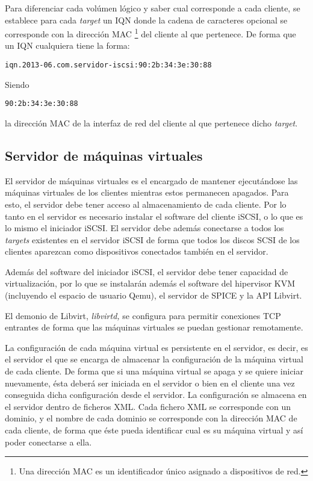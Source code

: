 \documentclass[spanisheDIVcalc,twoside,parskip-,pointlessnumbers,final]{scrbook}
\begin{document}
Para diferenciar cada volúmen lógico y saber cual corresponde a cada
cliente, se establece para cada \emph{target }un IQN donde la cadena
de caracteres opcional se corresponde con la dirección MAC%
\footnote{Una dirección MAC es un identificador único asignado a dispositivos
de red.%
} del cliente al que pertenece. De forma que un IQN cualquiera tiene
la forma:

\begin{lstlisting}
iqn.2013-06.com.servidor-iscsi:90:2b:34:3e:30:88
\end{lstlisting}


Siendo 
\begin{lstlisting}
90:2b:34:3e:30:88
\end{lstlisting}
\emph{ }la dirección MAC de la interfaz
de red del cliente al que pertenece dicho \emph{target}.


\subsection{Servidor de máquinas virtuales}

El servidor de máquinas virtuales es el encargado de mantener ejecutándose
las máquinas virtuales de los clientes mientras estos permanecen apagados.
Para esto, el servidor debe tener acceso al almacenamiento de cada
cliente. Por lo tanto en el servidor es necesario instalar el software
del cliente iSCSI, o lo que es lo mismo el iniciador iSCSI. El servidor
debe además conectarse a todos los \emph{targets} existentes en el
servidor iSCSI de forma que todos los discos SCSI de los clientes
aparezcan como dispositivos conectados también en el servidor.

Además del software del iniciador iSCSI, el servidor debe tener capacidad
de virtualización, por lo que se instalarán además el software del hipervisor
KVM (incluyendo el espacio de usuario Qemu), el servidor de SPICE
y la API Libvirt.

El demonio de Libvirt, \emph{libvirtd, }se configura para permitir
conexiones TCP entrantes de forma que las máquinas virtuales se puedan
gestionar remotamente.

La configuración de cada máquina virtual es persistente en el servidor,
es decir, es el servidor el que se encarga de almacenar la configuración
de la máquina virtual de cada cliente. De forma que si una máquina
virtual se apaga y se quiere iniciar nuevamente, ésta deberá ser iniciada
en el servidor o bien en el cliente una vez conseguida dicha configuración
desde el servidor. La configuración se almacena en el servidor dentro
de ficheros XML. Cada fichero XML se corresponde con un dominio, y
el nombre de cada dominio se corresponde con la dirección MAC de cada
cliente, de forma que éste pueda identificar cual es su máquina
virtual y así poder conectarse a ella.
\end{document}
